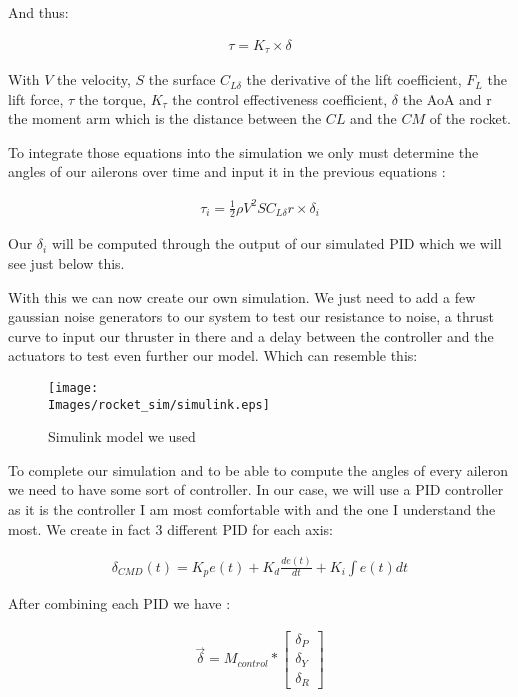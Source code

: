 And thus:

\begin{gather*}
    \tau = K_\tau \times \delta
\end{gather*}

With $V$ the velocity, $S$ the surface $C_{L \delta}$ the derivative of the
lift coefficient, $F_L$ the lift force, $\tau$ the torque, $K_\tau$ the control
effectiveness coefficient, $\delta$ the AoA and r the moment arm which is the
distance between the $CL$ and the $CM$ of the rocket.

To integrate those equations into the simulation we only must determine the
angles of our ailerons over time and input it in the previous equations :

\begin{gather*}
    \tau_i = \frac{1}{2} \rho V^2 S C_{L \delta} r \times \delta_i
\end{gather*}

Our $\delta_i$ will be computed through the output of our simulated PID which
we will see just below this.

With this we can now create our own simulation. We just need to add a few
gaussian noise generators to our system to test our resistance to noise, a
thrust curve to input our thruster in there and a delay between the controller
and the actuators to test even further our model. Which can resemble this:

\begin{figure}[!hbt]
    \centering
    \texttt{[image: \\Images/rocket\_sim/simulink.eps]}
    \caption{Simulink model we used}
\end{figure}
\FloatBarrier

To complete our simulation and to be able to compute the angles of every
aileron we need to have some sort of controller. In our case, we will use a PID
controller as it is the controller I am most comfortable with and the one I
understand the most. We create in fact 3 different PID for each axis:

\begin{gather*}
    \delta_{CMD}(t) = K_p e(t) + K_d \frac{de(t)}{dt} + K_i \int e(t) dt
\end{gather*}

After combining each PID we have :

\begin{gather*}
    \overrightarrow{\delta} = M_{control} *
    \begin{bmatrix}
        \delta_P \\
        \delta_Y \\
        \delta_R
    \end{bmatrix}
\end{gather*}

